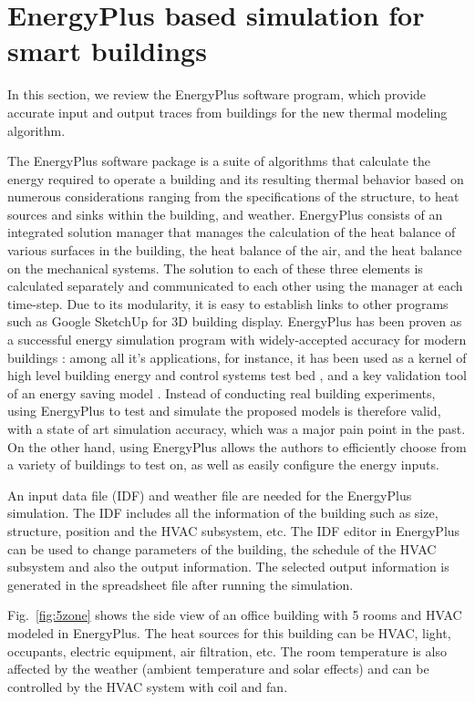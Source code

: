 \section{EnergyPlus based simulation for smart buildings}
\label{sec:energy_plus_review}
In this section, we review the EnergyPlus software program, which provide
accurate input and output traces from buildings for the new thermal
modeling algorithm.

The EnergyPlus software package is a suite of algorithms that calculate the
energy required to operate a building and its resulting thermal behavior based
on numerous considerations ranging from the specifications of the structure, to
heat sources and sinks within the building, and weather. EnergyPlus consists of
an integrated solution manager that manages the calculation of the heat balance
of various surfaces in the building, the heat balance of the air, and the heat
balance on the mechanical systems. The solution to each of these three elements
is calculated separately and communicated to each other using the manager at
each time-step. Due to its modularity, it is easy to establish links to other
programs such as Google SketchUp for 3D building display. EnergyPlus has been
proven as a successful energy simulation program with widely-accepted accuracy
for modern buildings \cite{yang2016review}: among all it's applications, for
instance, it has been used as a kernel of high level building energy and
control systems test bed \cite{wetter2011co}, and a key validation tool of an
energy saving model \cite{mardaljevic2009daylight}. Instead of conducting real
building experiments, using EnergyPlus to test and simulate the proposed models
is therefore valid, with a state of art simulation accuracy, which was a major
pain point in the past. On the other hand, using EnergyPlus allows the authors
to efficiently choose from a variety of buildings to test on, as well as easily
configure the energy inputs.

An input data file (IDF) and weather file are needed for the EnergyPlus
simulation. The IDF includes all the information of the building such
as size, structure, position and the HVAC subsystem, etc. The IDF
editor in EnergyPlus can be used to change parameters of the building, the
schedule of the HVAC subsystem and also the output information. The
selected output information is generated in the spreadsheet file
after running the simulation.

Fig.~\ref{fig:5zone} shows the side view of an office building
with 5 rooms and HVAC modeled in EnergyPlus. The heat sources for this building
can be HVAC, light, occupants, electric equipment, air filtration, etc. The
room temperature is also affected by the weather (ambient temperature and solar
effects) and can be controlled by the HVAC system with coil
and fan.

